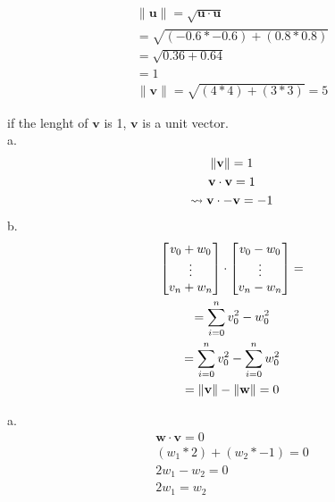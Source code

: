 \documentclass{report}
\begin{document}
\begin{question}{2}{}
    \begin{gather*}
        \lVert \mathbf{u} \rVert = \sqrt{\mathbf{u} \cdot \mathbf{u}} \\
        = \sqrt{(-0.6 * -0.6) + (0.8 * 0.8)} \\
        = \sqrt{0.36 + 0.64} \\
        = 1
    \end{gather*}
    \begin{gather*}
        \lVert \mathbf{v} \rVert = \sqrt{(4*4) + (3 * 3)} = 5
    \end{gather*}
\end{question}

\begin{question}{4}{}
    if the lenght of $\mathbf{v}$ is 1, $\mathbf{v}$ is a unit vector.\\
    a.
    \begin{gather*}
        \lVert \mathbf{v} \rVert = 1 \\
        \mathbf{v} \cdot \mathbf{v} = 1 \\
        \leadsto \mathbf{v} \cdot \mathbf{-v} = -1
    \end{gather*}
    b.
    \begin{gather*}
        \begin{bmatrix}
            v_0 + w_0\\
            \vdots \\
            v_n + w_n\\
        \end{bmatrix} \cdot
        \begin{bmatrix}
            v_0 - w_0\\
            \vdots \\
            v_n - w_n\\
        \end{bmatrix} = \\
        = \sum_{i = 0}^{n} { v_0^2 - w_0^2 } \\
        = \sum_{i = 0}^{n} { v_0^2 } - \sum_{i = 0}^{n} {
        w_0^2 } \\
        = \lVert \mathbf{v} \rVert - \lVert \mathbf{w} \rVert = 0
    \end{gather*}
\end{question}

\begin{question}{6}{}
    a.
    \begin{gather*}
        \mathbf{w} \cdot \mathbf{v} = 0 \\
        (w_1 * 2) + (w_2 * -1) = 0 \\
        2w_1 - w_2 = 0 \\
        2w_1 = w_2
    \end{gather*}
\end{question}
\end{document}
